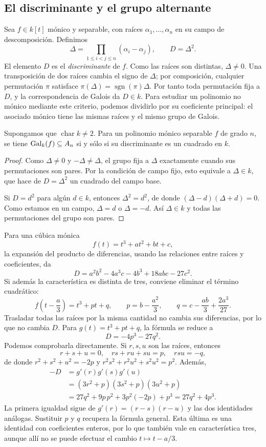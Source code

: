 \subsection{El discriminante y el grupo alternante}\label{tema:27-3-2}
Sea $f\in k[t]$ mónico y separable, con raíces $\alpha_1,\ldots,\alpha_n$ en su campo de descomposición. Definimos
\[
\Delta=\prod_{1\leq i<j\leq n}(\alpha_i-\alpha_j),
\qquad D=\Delta^2.
\]
El elemento $D$ es el \emph{discriminante} de $f$. Como las raíces son distintas, $\Delta\ne0$. Una transposición de dos raíces cambia el signo de $\Delta$; por composición, cualquier permutación $\pi$ satisface $\pi(\Delta)=\operatorname{sgn}(\pi)\Delta$. Por tanto toda permutación fija a $D$, y la correspondencia de Galois da $D\in k$. Para estudiar un polinomio no mónico mediante este criterio, podemos dividirlo por su coeficiente principal: el asociado mónico tiene las mismas raíces y el mismo grupo de Galois.

\begin{lema}\label{lema:C27-discriminante}
Supongamos que $\operatorname{char}k\ne2$. Para un polinomio mónico separable $f$ de grado $n$, se tiene $\operatorname{Gal}_k(f)\subseteq A_n$ si y sólo si su discriminante es un cuadrado en $k$.
\end{lema}
\begin{proof}
Como $\Delta\ne0$ y $-\Delta\ne\Delta$, el grupo fija a $\Delta$ exactamente cuando sus permutaciones son pares. Por la condición de campo fijo, esto equivale a $\Delta\in k$, que hace de $D=\Delta^2$ un cuadrado del campo base.

Si $D=d^2$ para algún $d\in k$, entonces $\Delta^2=d^2$, de donde $(\Delta-d)(\Delta+d)=0$. Como estamos en un campo, $\Delta=d$ o $\Delta=-d$. Así $\Delta\in k$ y todas las permutaciones del grupo son pares.
\end{proof}

Para una cúbica mónica
\[
f(t)=t^3+at^2+bt+c,
\]
la expansión del producto de diferencias, usando las relaciones entre raíces y coeficientes, da
\[
D=a^2b^2-4a^3c-4b^3+18abc-27c^2.
\]
Si además la característica es distinta de tres, conviene eliminar el término cuadrático:
\[
f\left(t-\frac a3\right)=t^3+pt+q,
\qquad p=b-\frac{a^2}{3},\qquad q=c-\frac{ab}{3}+\frac{2a^3}{27}.
\]
Trasladar todas las raíces por la misma cantidad no cambia sus diferencias, por lo que no cambia $D$. Para $g(t)=t^3+pt+q$, la fórmula se reduce a
\[
D=-4p^3-27q^2.
\]
Podemos comprobarla directamente. Si $r,s,u$ son las raíces, entonces
\[
r+s+u=0,\quad rs+ru+su=p,\quad rsu=-q,
\]
de donde $r^2+s^2+u^2=-2p$ y $r^2s^2+r^2u^2+s^2u^2=p^2$. Además,
\[
\begin{aligned}
-D&=g'(r)g'(s)g'(u)\\
&=(3r^2+p)(3s^2+p)(3u^2+p)\\
&=27q^2+9p\,p^2+3p^2(-2p)+p^3
=27q^2+4p^3.
\end{aligned}
\]
La primera igualdad sigue de $g'(r)=(r-s)(r-u)$ y las dos identidades análogas. Sustituir $p$ y $q$ recupera la fórmula general. Esta última es una identidad con coeficientes enteros, por lo que también vale en característica tres, aunque allí no se puede efectuar el cambio $t\mapsto t-a/3$.

